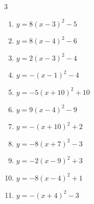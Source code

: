 \begin{multicols}{3}
\begin{enumerate}
        \phantom{$\displaystyle 頂点\left( -8 , 1 \right)$}

  \item $\displaystyle y=8\left( x-3\right)^{2}-5$

        \phantom{$\displaystyle 頂点\left( 3 , -5 \right)$}

\columnbreak %

  \item $\displaystyle y=8\left( x-4\right)^{2}-6$

        \phantom{$\displaystyle 頂点\left( 4 , -6 \right)$}

  \item $\displaystyle y=2\left( x-3\right)^{2}-4$

        \phantom{$\displaystyle 頂点\left( 3 , -4 \right)$}

  \item $\displaystyle y=-\left( x-1\right)^{2}-4$

        \phantom{$\displaystyle 頂点\left( 1 , -4 \right)$}

  \item $\displaystyle y=-5\left( x+10\right)^{2}+10$

        \phantom{$\displaystyle 頂点\left( -10 , 10 \right)$}

  \item $\displaystyle y=9\left( x-4\right)^{2}-9$

        \phantom{$\displaystyle 頂点\left( 4 , -9 \right)$}

  \item $\displaystyle y=-\left( x+10\right)^{2}+2$

        \phantom{$\displaystyle 頂点\left( -10 , 2 \right)$}

  \item $\displaystyle y=-8\left( x+7\right)^{2}-3$

        \phantom{$\displaystyle 頂点\left( -7 , -3 \right)$}

  \item $\displaystyle y=-2\left( x-9\right)^{2}+3$

        \phantom{$\displaystyle 頂点\left( 9 , 3 \right)$}

  \item $\displaystyle y=-8\left( x-4\right)^{2}+1$

        \phantom{$\displaystyle 頂点\left( 4 , 1 \right)$}

  \item $\displaystyle y=-\left( x+4\right)^{2}-3$


\end{enumerate}
\end{multicols}
